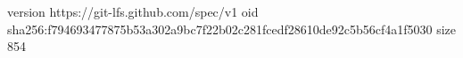 version https://git-lfs.github.com/spec/v1
oid sha256:f794693477875b53a302a9bc7f22b02c281fcedf28610de92c5b56cf4a1f5030
size 854
